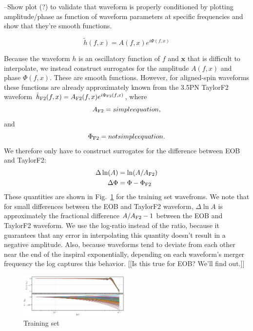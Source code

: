 \documentclass[prd,aps,letter,twocolumn,floatfix,notitlepage]{revtex4-1}
\begin{document}
--Show plot (?) to validate that waveform is properly conditioned by plotting amplitude/phase as function of waveform parameters
at specific frequencies and show that they're smooth functions.

\begin{equation}
\tilde h(f, x) = A(f, x) e^{i\Phi(f, x)}
\end{equation}

Because the waveform $h$ is an oscillatory function of $f$ and ${\bm x}$ that is difficult to interpolate, we instead construct 
surrogates for the amplitude $A(f, x)$ and phase $\Phi(f, x)$. These are smooth functions. However, for aligned-spin waveforms
these functions are already approximately known from the 3.5PN TaylorF2 waveform 
$\tilde h_{\rm F2}(f, x) = A_{\rm F2}(f, x) e^{i\Phi_{\rm F2} (f, x)}$, where
\begin{equation}
A_{\rm F2} = simple equation,
\end{equation}
and
\begin{equation}
\Phi_{\rm F2} = not simple equation.
\end{equation}
We therefore only have to construct surrogates for the difference between EOB and TaylorF2:
\begin{align}
\Delta\ln(A) &= \ln(A/A_{\rm F2})\\
\Delta\Phi & = \Phi - \Phi_{\rm F2}
\end{align}
These quantities are shown in Fig.~\ref{fig:dh} for the training set wavefroms. We note that for small differences 
between the EOB and TaylorF2 waveform, $\Delta\ln A$ is approximately the fractional difference $A/A_{\rm F2} - 1$
between the EOB and TaylorF2 waveform. We use the log-ratio instead of the ratio, because it guarantees that any
error in interpolating this quantity doesn't result in a negative amplitude. Also, because waveforms tend to deviate from 
each other near the end of the inspiral exponentially, depending on each waveform's merger frequency the log captures
this behavior. [[Is this true for EOB? We'll find out.]]

\begin{figure}[htb]
\centering
\includegraphics[width=0.49\textwidth]{dh_trainingset.png}
\caption{Training set}
\label{fig:dh}
\end{figure}
\end{document}
